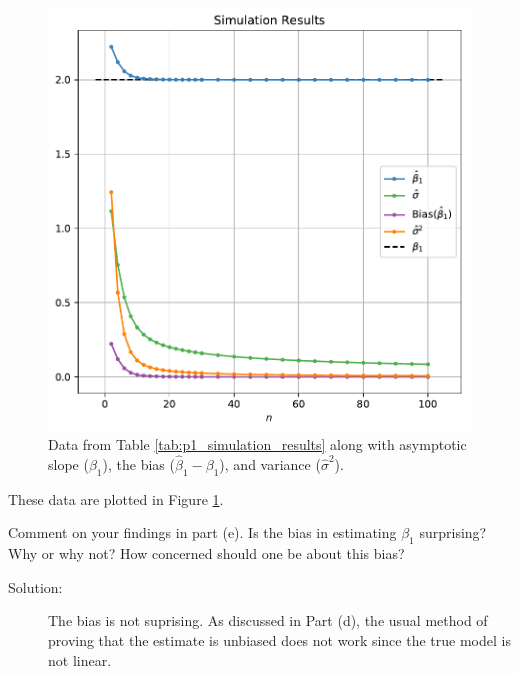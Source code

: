 \documentclass[11pt, letterpaper]{article}
\begin{document}
{\begin{enumerate}[(a)]
\begin{description}
  \begin{figure}
    \centering
    \includegraphics{p1_simulation_results.pdf}
    \caption{Data from Table \ref{tab:p1_simulation_results} along with
      asymptotic slope ($\beta_1$), the bias ($\hat{\beta}_1 - \beta_1$), and
      variance ($\hat{\sigma}^2$).}
    \label{fig:p1_simulation_results}
  \end{figure}

  These data are plotted in Figure \ref{fig:p1_simulation_results}.
\end{description}

{\item Comment on your findings in part (e).  Is the bias in estimating $\beta_1$ surprising?  Why or why not?  How concerned should one be about this bias? }

\begin{description}
\item[Solution:] The bias is not suprising. As discussed in Part (d), the usual
  method of proving that the estimate is unbiased does not work since the true
  model is not linear.


\end{description}
\end{enumerate}}
\end{document}

